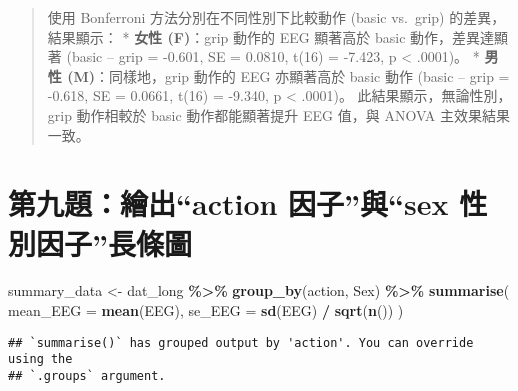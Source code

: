 \documentclass[
  12pt,
]{article}
\newenvironment{Shaded}{\begin{snugshade}}{\end{snugshade}}
\newcommand{\AttributeTok}[1]{\textcolor[rgb]{0.13,0.29,0.53}{#1}}
\newcommand{\FunctionTok}[1]{\textcolor[rgb]{0.13,0.29,0.53}{\textbf{#1}}}
\newcommand{\NormalTok}[1]{#1}
\newcommand{\OtherTok}[1]{\textcolor[rgb]{0.56,0.35,0.01}{#1}}
\newcommand{\SpecialCharTok}[1]{\textcolor[rgb]{0.81,0.36,0.00}{\textbf{#1}}}
\begin{document}
\begin{quote}
使用 Bonferroni 方法分別在不同性別下比較動作 (basic vs.~grip)
的差異，結果顯示： * \textbf{女性 (F)}：grip 動作的 EEG 顯著高於 basic
動作，差異達顯著 (basic -- grip = -0.601, SE = 0.0810, t(16) = -7.423, p
\textless{} .0001)。 * \textbf{男性 (M)}：同樣地，grip 動作的 EEG
亦顯著高於 basic 動作 (basic -- grip = -0.618, SE = 0.0661, t(16) =
-9.340, p \textless{} .0001)。 此結果顯示，無論性別，grip 動作相較於
basic 動作都能顯著提升 EEG 值，與 ANOVA 主效果結果一致。
\end{quote}

\section{第九題：繪出``action 因子''與``sex
性別因子''長條圖}\label{ux7b2cux4e5dux984cux7e6aux51faaction-ux56e0ux5b50ux8207sex-ux6027ux5225ux56e0ux5b50ux9577ux689dux5716}

\begin{Shaded}
\begin{Highlighting}[]
\NormalTok{summary\_data }\OtherTok{\textless{}{-}}\NormalTok{ dat\_long }\SpecialCharTok{\%\textgreater{}\%}
  \FunctionTok{group\_by}\NormalTok{(action, Sex) }\SpecialCharTok{\%\textgreater{}\%}
  \FunctionTok{summarise}\NormalTok{(}
    \AttributeTok{mean\_EEG =} \FunctionTok{mean}\NormalTok{(EEG),}
    \AttributeTok{se\_EEG =} \FunctionTok{sd}\NormalTok{(EEG) }\SpecialCharTok{/} \FunctionTok{sqrt}\NormalTok{(}\FunctionTok{n}\NormalTok{())}
\NormalTok{  )}
\end{Highlighting}
\end{Shaded}

\begin{verbatim}
## `summarise()` has grouped output by 'action'. You can override using the
## `.groups` argument.
\end{verbatim}
\end{document}
